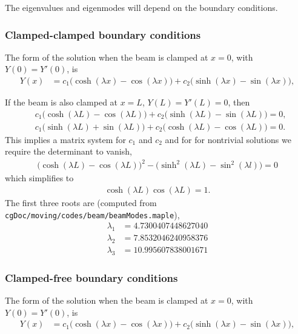 \documentclass[11pt]{article}
\begin{document}
The eigenvalues and eigenmodes will depend on the boundary conditions.
\subsubsection{Clamped-clamped boundary conditions} 

The form of the solution when the beam is clamped at $x=0$, with $Y(0)=Y'(0)$, is 
\begin{align*}
    Y(x) &= c_1 \big(\cosh(\lambda x) -\cos(\lambda x) \big) + c_2 \big(\sinh(\lambda x) - \sin(\lambda x)\big),
\end{align*}

If the beam is also clamped at $x=L$, $Y(L)=Y'(L)=0$, 
then
\begin{align*}
  &  c_1 \big(\cosh(\lambda L) -\cos(\lambda L) \big) + c_2 \big(\sinh(\lambda L) - \sin(\lambda L)\big) = 0 , \\
  &  c_1 \big(\sinh(\lambda L) +\sin(\lambda L) \big) + c_2 \big(\cosh(\lambda L) - \cos(\lambda L)\big) = 0 . 
\end{align*}
This implies a matrix system for $c_1$ and $c_2$ and for 
for nontrivial solutions we require the determinant to vanish, 
\begin{align*}
   \big(\cosh(\lambda L) -\cos(\lambda L) \big)^2 - \big( \sinh^2(\lambda L) - \sin^2(\lambda l) \big)=0
\end{align*}
which simplifies to
\begin{align*}
   \cosh(\lambda L)\cos(\lambda L) = 1 .
\end{align*}
The first three roots are (computed from {\tt cgDoc/moving/codes/beam/beamModes.maple}),
\begin{align*}
   \lambda_1 &=4.7300407448627040  \\
   \lambda_2 &=7.8532046240958376  \\
   \lambda_3 &=10.995607838001671
\end{align*}


\subsubsection{Clamped-free boundary conditions} 

The form of the solution when the beam is clamped at $x=0$, with $Y(0)=Y'(0)$, is 
\begin{align*}
    Y(x) &= c_1 \big(\cosh(\lambda x) -\cos(\lambda x) \big) + c_2 \big(\sinh(\lambda x) - \sin(\lambda x)\big),
\end{align*}
\end{document}

